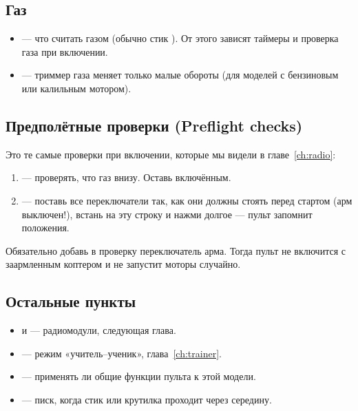 \subsection{Газ}

\begin{itemize}
  \item {} --- что считать газом (обычно стик ). От этого
        зависят таймеры и проверка газа при включении.
  \item {} --- триммер газа меняет только малые обороты
        (для моделей с бензиновым или калильным мотором).
\end{itemize}

\subsection{Предполётные проверки (Preflight checks)}

Это те самые проверки при включении, которые мы видели в главе~\ref{ch:radio}:

\begin{center}
\end{center}

\begin{enumerate}
  \item {} --- проверять, что газ внизу. Оставь включённым.
  \item {} --- поставь все переключатели так, как они должны стоять перед
        стартом (арм выключен!), встань на эту строку и нажми долгое  ---
        пульт запомнит положения.
\end{enumerate}

\begin{tip}
Обязательно добавь в проверку переключатель арма. Тогда пульт не включится с заармленным
коптером и не запустит моторы случайно.
\end{tip}

\subsection{Остальные пункты}

\begin{itemize}
  \item {} и  --- радиомодули, следующая глава.
  \item {} --- режим «учитель--ученик», глава~\ref{ch:trainer}.
  \item {} --- применять ли общие функции пульта к этой модели.
  \item {} --- писк, когда стик или крутилка проходит через середину.
\end{itemize}

